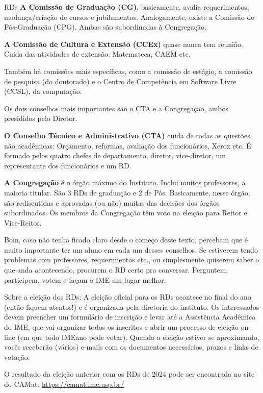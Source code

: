 \begin{subsecao}{RDs}
{\bf A Comissão de Graduação (CG)}, basicamente, avalia requerimentos,
mudança/criação de cursos e jubilamentos. Analogamente, existe a Comissão de
Pós-Graduação (CPG). Ambas são subordinadas à Congregação.

{\bf A Comissão de Cultura e Extensão (CCEx)} quase nunca tem reunião. Cuida
das atividades de extensão: Matemateca, CAEM etc.

Também há comissões mais específicas, como a comissão de estágio, a comissão de
pesquisa (do doutorado) e o Centro de Competência em Software Livre (CCSL), da
computação.

Os dois conselhos mais importantes são o CTA e a Congregação, ambos presididos
pelo Diretor.

{\bf O Conselho Técnico e Administrativo (CTA)} cuida de todas as questões não
acadêmicas: Orçamento, reformas, avaliação dos funcionários, Xerox etc. É
formado pelos quatro chefes de departamento, diretor, vice-diretor, um
representante dos funcionários e um RD.

{\bf A Congregação} é o órgão máximo do Instituto. Inclui muitos professores, a
maioria titular. São 3 RDs de graduação e 2 de Pós. Basicamente,
nesse órgão, são rediscutidas e aprovadas (ou não) muitas das decisões
dos órgãos subordinados. Os membros da Congregação têm voto na eleição para
Reitor e Vice-Reitor.

Bom, caso não tenha ficado claro desde o começo desse texto, percebam que é
muito importante ter um aluno em cada um desses conselhos. Se estiverem tendo
problemas com professores, requerimentos etc., ou simplesmente quiserem saber
o que anda acontecendo, procurem o RD certo pra conversar. Perguntem,
participem, votem e façam o IME um lugar melhor.

Sobre a eleição dos RDs: A eleição oficial para os RDs acontece no final do ano
(então fiquem atentos!) e é organizada pela diretoria do instituto. Os
interessados devem preencher um formulário de inscrição e levar até a
Assistência Acadêmica do IME, que vai organizar todos os inscritos e abrir um
processo de eleição on-line (em que todo IMEano pode votar). Quando a eleição
estiver se aproximando, vocês receberão (vários) e-mails com os documentos
necessários, prazos e links de votação.

O resultado da eleição anterior com os RDs de 2024 pode ser encontrada no site
do CAMat:
\url{https://camat.ime.usp.br/}


\end{subsecao}
